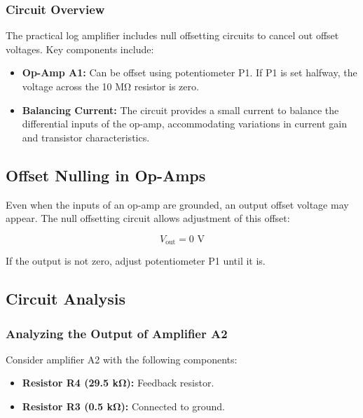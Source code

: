 \documentclass[a4paper,9pt,twoside,openany,twocolumn]{memoir}
\begin{document}
\subsubsection{Circuit Overview}

The practical log amplifier includes null offsetting circuits to cancel out offset voltages. Key components include:

\begin{itemize}
    \item \textbf{Op-Amp A1:} Can be offset using potentiometer P1. If P1 is set halfway, the voltage across the 10 MΩ resistor is zero.
    \item \textbf{Balancing Current:} The circuit provides a small current to balance the differential inputs of the op-amp, accommodating variations in current gain and transistor characteristics.
\end{itemize}

\subsection{Offset Nulling in Op-Amps}

Even when the inputs of an op-amp are grounded, an output offset voltage may appear. The null offsetting circuit allows adjustment of this offset:

\begin{equation}
    V_{\text{out}} = 0 \text{ V}
\end{equation}

If the output is not zero, adjust potentiometer P1 until it is.

\subsection{Circuit Analysis}

\subsubsection{Analyzing the Output of Amplifier A2}

Consider amplifier A2 with the following components:

\begin{itemize}
    \item \textbf{Resistor R4 (29.5 kΩ):} Feedback resistor.
    \item \textbf{Resistor R3 (0.5 kΩ):} Connected to ground.
\end{itemize}
\end{document}

